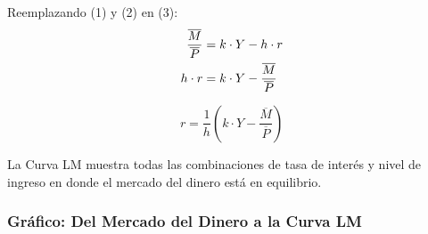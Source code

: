 \documentclass[11pt,a4paper]{article}
\newcommand{\barvar}[1]{\overline{#1}}
\begin{document}
Reemplazando (1) y (2) en (3):
\begin{align}
    \frac{\barvar{M}}{\barvar{P}} &= k \cdot Y - h \cdot r \notag \\
    h \cdot r &= k \cdot Y - \frac{\barvar{M}}{\barvar{P}} \notag
\end{align}

\begin{resultadobox}[Curva LM]
\begin{equation}
    r = \frac{1}{h}\left(k \cdot Y - \frac{\barvar{M}}{\barvar{P}}\right) \tag{4}
\end{equation}
\end{resultadobox}

\begin{definicionbox}
La Curva LM muestra todas las combinaciones de tasa de interés y nivel de ingreso en donde el mercado del dinero está en equilibrio.
\end{definicionbox}

\subsubsection{Gráfico: Del Mercado del Dinero a la Curva LM}
\end{document}
